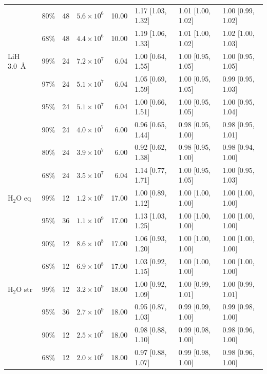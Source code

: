 \begin{table}[!htb]
{\begin{tabular}{lrrrrlll}
 & 80\% & 48 & $5.6\times10^{6}$ & 10.00 & 1.17 [1.03, 1.32] & 1.01 [1.00, 1.02] & 1.00 [0.99, 1.02] \\
 & 68\% & 48 & $4.4\times10^{6}$ & 10.00 & 1.19 [1.06, 1.33] & 1.01 [1.00, 1.02] & 1.02 [1.00, 1.03] \\
\midrule
LiH 3.0~\AA & 99\% & 24 & $7.2\times10^{7}$ & 6.04 & 1.00 [0.64, 1.55] & 1.00 [0.95, 1.05] & 1.00 [0.95, 1.05] \\
 & 97\% & 24 & $5.1\times10^{7}$ & 6.04 & 1.05 [0.69, 1.59] & 1.00 [0.95, 1.05] & 0.99 [0.95, 1.03] \\
 & 95\% & 24 & $5.1\times10^{7}$ & 6.04 & 1.00 [0.66, 1.51] & 1.00 [0.95, 1.05] & 1.00 [0.95, 1.04] \\
 & 90\% & 24 & $4.0\times10^{7}$ & 6.00 & 0.96 [0.65, 1.44] & 0.98 [0.95, 1.00] & 0.98 [0.95, 1.01] \\
 & 80\% & 24 & $3.9\times10^{7}$ & 6.00 & 0.92 [0.62, 1.38] & 0.98 [0.95, 1.00] & 0.98 [0.94, 1.00] \\
 & 68\% & 24 & $3.5\times10^{7}$ & 6.04 & 1.14 [0.77, 1.71] & 1.00 [0.95, 1.05] & 1.00 [0.95, 1.03] \\
\midrule
H$_2$O eq & 99\% & 12 & $1.2\times10^{9}$ & 17.00 & 1.00 [0.89, 1.12] & 1.00 [1.00, 1.00] & 1.00 [1.00, 1.00] \\
 & 95\% & 36 & $1.1\times10^{9}$ & 17.00 & 1.13 [1.03, 1.25] & 1.00 [1.00, 1.00] & 1.00 [1.00, 1.00] \\
 & 90\% & 12 & $8.6\times10^{8}$ & 17.00 & 1.06 [0.93, 1.20] & 1.00 [1.00, 1.00] & 1.00 [1.00, 1.00] \\
 & 68\% & 12 & $6.9\times10^{8}$ & 17.00 & 1.03 [0.92, 1.15] & 1.00 [1.00, 1.00] & 1.00 [1.00, 1.00] \\
\midrule
H$_2$O str & 99\% & 12 & $3.2\times10^{9}$ & 18.00 & 1.00 [0.92, 1.09] & 1.00 [0.99, 1.01] & 1.00 [0.99, 1.01] \\
 & 95\% & 36 & $2.7\times10^{9}$ & 18.00 & 0.95 [0.87, 1.03] & 0.99 [0.99, 1.00] & 0.99 [0.98, 1.00] \\
 & 90\% & 12 & $2.5\times10^{9}$ & 18.00 & 0.98 [0.88, 1.10] & 0.99 [0.98, 1.00] & 0.98 [0.96, 1.00] \\
 & 68\% & 12 & $2.0\times10^{9}$ & 18.00 & 0.97 [0.88, 1.07] & 0.99 [0.98, 1.00] & 0.98 [0.96, 1.00] \\
\bottomrule
\end{tabular}}
\end{table}
